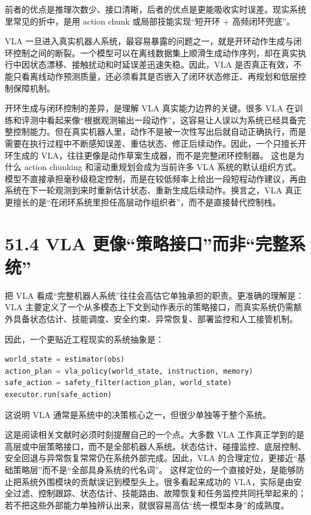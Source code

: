 前者的优点是推理次数少、接口清晰，后者的优点是更能吸收实时误差。现实系统里常见的折中，是用 action chunk 或局部技能实现“短开环 + 高频闭环兜底”。

VLA 一旦进入真实机器人系统，最容易暴露的问题之一，就是开环动作生成与闭环控制之间的断裂。一个模型可以在离线数据集上顺滑生成动作序列，却在真实执行中因状态漂移、接触扰动和时延误差迅速失稳。因此，VLA 是否真正有效，不能只看离线动作预测质量，还必须看其是否嵌入了闭环状态修正、再规划和低层控制保障机制。

开环生成与闭环控制的差异，是理解 VLA 真实能力边界的关键。很多 VLA 在训练和评测中看起来像“根据观测输出一段动作”，这容易让人误以为系统已经具备完整控制能力。但在真实机器人里，动作不是被一次性写出后就自动正确执行，而是需要在执行过程中不断感知误差、重估状态、修正后续动作。因此，一个只擅长开环生成的 VLA，往往更像是动作草案生成器，而不是完整闭环控制器。 这也是为什么 action chunking 和滚动重规划会成为当前许多 VLA 系统的默认组织方式。模型不直接承担毫秒级稳定控制，而是在较低频率上给出一段短程动作建议，再由系统在下一轮观测到来时重新估计状态、重新生成后续动作。换言之，VLA 真正更擅长的是“在闭环系统里担任高层动作组织者”，而不是直接替代控制栈。

\section*{51.4 VLA 更像“策略接口”而非“完整系统”}


把 VLA 看成“完整机器人系统”往往会高估它单独承担的职责。更准确的理解是：VLA 主要定义了一个从多模态上下文到动作表示的策略接口，而真实系统仍需额外具备状态估计、技能调度、安全约束、异常恢复、部署监控和人工接管机制。

因此，一个更贴近工程现实的系统抽象是：

\begin{lstlisting}[language=python]
world_state = estimator(obs)
action_plan = vla_policy(world_state, instruction, memory)
safe_action = safety_filter(action_plan, world_state)
executor.run(safe_action)
\end{lstlisting}

这说明 VLA 通常是系统中的决策核心之一，但很少单独等于整个系统。

这是阅读相关文献时必须时刻提醒自己的一个点。大多数 VLA 工作真正学到的是高层或中层策略接口，而不是全部机器人系统。状态估计、碰撞监控、底层控制、安全回退与异常恢复常常仍在系统外部完成。因此，VLA 的合理定位，更接近“基础策略层”而不是“全部具身系统的代名词”。 这样定位的一个直接好处，是能够防止把系统外围模块的贡献误记到模型头上。很多看起来成功的 VLA，实际是由安全过滤、控制跟踪、状态估计、技能路由、故障恢复和任务监控共同托举起来的；若不把这些外部能力单独辨认出来，就很容易高估“统一模型本身”的成熟度。

